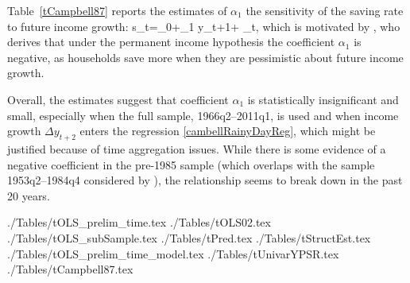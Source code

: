 \documentclass[titlepage]{\econtex}
\begin{document}
Table~\ref{tCampbell87} reports the estimates of $\alpha_1$ the sensitivity of the saving rate to future income growth:
\be
s_t=\alpha_0+\alpha_1 \Delta y_{t+1}+ \varepsilon_t, \label{cambellRainyDayReg}
\ee
which is motivated by \cite{cam87}, who derives that under the permanent income hypothesis the coefficient $\alpha_1$ is negative, as households save more when they are pessimistic about future income growth.

Overall, the estimates suggest that coefficient $\alpha_1$ is statistically insignificant and small, especially when the full sample, 1966q2--2011q1, is used and when income growth $\Delta y_{t+2}$ enters the regression \eqref{cambellRainyDayReg}, which might be justified because of time aggregation issues. While there is some evidence of a negative coefficient in the pre-1985 sample (which overlaps with the sample 1953q2--1984q4 considered by \cite{cam87}), the relationship seems to break down in the past 20 years.



\newpage

./Tables/tOLS_prelim_time.tex
./Tables/tOLS02.tex
./Tables/tOLS_subSample.tex
./Tables/tPred.tex
./Tables/tStructEst.tex
./Tables/tOLS_prelim_time_model.tex
./Tables/tUnivarYPSR.tex
./Tables/tCampbell87.tex
\end{document}
